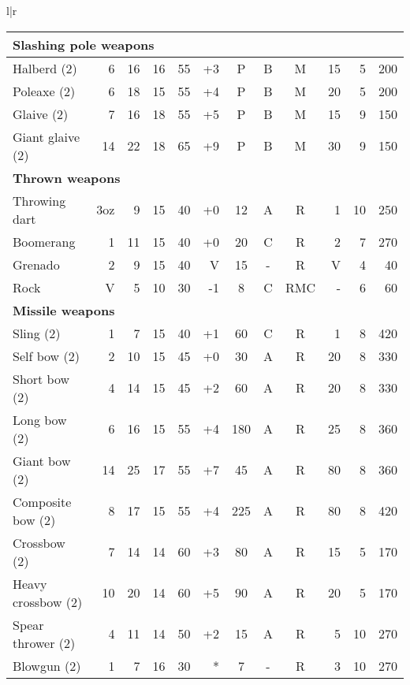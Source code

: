 \begin{tabular}[t]{l|r}
\begin{minipage}[t]{4.8in}
\begin{tabularx}{\linewidth}[t]{Xrrrrrcccrrr}
\multicolumn{12}{l}{\textbf{Slashing pole weapons}} \\ \hline
Halberd (2)			& 6	& 16	& 16	& 55	& +3	& P	& B	& M	& 15	& 5	& 200 \\ \hline
Poleaxe (2)			& 6	& 18	& 15	& 55	& +4	& P	& B	& M	& 20	& 5	& 200 \\ \hline
Glaive (2)			& 7	& 16	& 18	& 55	& +5	& P	& B	& M	& 15	& 9	& 150 \\ \hline
Giant glaive (2)\footnotemark[2]& 14	& 22	& 18	& 65	& +9	& P	& B	& M	& 30	& 9	& 150 \\ \hline

\multicolumn{12}{l}{\textbf{Thrown weapons}\footnotemark} \\ \hline
Throwing dart\footnotemark	&3oz	&9	& 15	& 40	& +0	& 12	& A	& R	& 1	& 10	& 250 \\ \hline
Boomerang\footnotemark		& 1	& 11	& 15	& 40	& +0	& 20	& C	& R	& 2	& 7	& 270 \\ \hline
Grenado\footnotemark		& 2	& 9	& 15	& 40	& V	& 15	& -	& R	& V	& 4	& 40 \\ \hline
Rock				& V	& 5	& 10	& 30	& -1	& 8	& C	& RMC	& -	& 6	& 60 \\ \hline

\multicolumn{12}{l}{\textbf{Missile weapons}\footnotemark} \\ \hline
Sling (2)			& 1	& 7	& 15	& 40	& +1	& 60	& C	& R	& 1	& 8	& 420 \\ \hline
Self bow (2)			& 2	& 10	& 15	& 45	& +0	& 30	& A	& R	& 20	& 8	& 330 \\ \hline
Short bow (2)			& 4	& 14	& 15	& 45	& +2	& 60	& A	& R	& 20	& 8	& 330 \\ \hline
Long bow (2)\footnotemark	& 6	& 16	& 15	& 55	& +4	& 180	& A	& R	& 25	& 8	& 360 \\ \hline
Giant bow (2)\footnotemark[2]	& 14	& 25	& 17	& 55	& +7	& 45	& A	& R	& 80	& 8	& 360 \\ \hline
Composite bow (2)		& 8	& 17	& 15	& 55	& +4	& 225	& A	& R	& 80	& 8	& 420 \\ \hline
Crossbow (2)			& 7	& 14	& 14	& 60	& +3	& 80	& A	& R	& 15	& 5	& 170 \\ \hline
Heavy crossbow (2)		& 10	& 20	& 14	& 60	& +5	& 90	& A	& R	& 20	& 5	& 170 \\ \hline
Spear thrower (2)		& 4	& 11	& 14	& 50	& +2	& 15	& A	& R	& 5	& 10	& 270 \\ \hline
Blowgun (2)			& 1	& 7	& 16	& 30	& *	& 7	& -	& R	& 3	& 10	& 270 \\ \hline


\end{tabularx}
\end{minipage}
\end{tabular}
